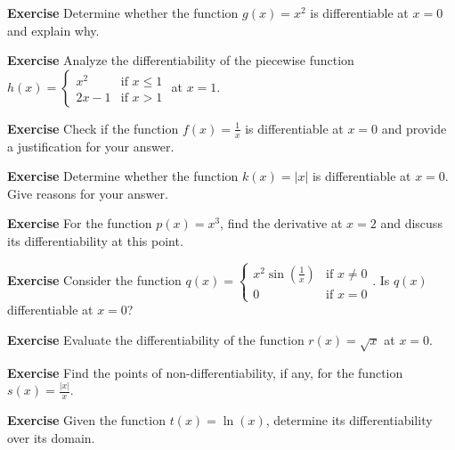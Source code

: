 \documentclass[a4paper,12pt]{book}
\newenvironment{exercise}[1][]
  {\par\medskip\noindent\textbf{Exercise #1} \rmfamily}
  {\medskip}
\begin{document}
\begin{exercise}
Determine whether the function \( g(x) = x^2 \) is differentiable at \( x = 0 \) and explain why.
\end{exercise}

\begin{exercise}
Analyze the differentiability of the piecewise function \( h(x) = 
\begin{cases} 
x^2 & \text{if } x \leq 1 \\
2x - 1 & \text{if } x > 1 
\end{cases} \) at \( x = 1 \).
\end{exercise}

\begin{exercise}
Check if the function \( f(x) = \frac{1}{x} \) is differentiable at \( x = 0 \) and provide a justification for your answer.
\end{exercise}

\begin{exercise}
Determine whether the function \( k(x) = |x| \) is differentiable at \( x = 0 \). Give reasons for your answer.
\end{exercise}

\begin{exercise}
For the function \( p(x) = x^3 \), find the derivative at \( x = 2 \) and discuss its differentiability at this point.
\end{exercise}

\begin{exercise}
Consider the function \( q(x) = 
\begin{cases} 
x^2 \sin(\frac{1}{x}) & \text{if } x \neq 0 \\
0 & \text{if } x = 0 
\end{cases} \). Is \( q(x) \) differentiable at \( x = 0 \)?
\end{exercise}

\begin{exercise}
Evaluate the differentiability of the function \( r(x) = \sqrt{x} \) at \( x = 0 \).
\end{exercise}

\begin{exercise}
Find the points of non-differentiability, if any, for the function \( s(x) = \frac{|x|}{x} \).
\end{exercise}

\begin{exercise}
Given the function \( t(x) = \ln(x) \), determine its differentiability over its domain.
\end{exercise}
\end{document}
